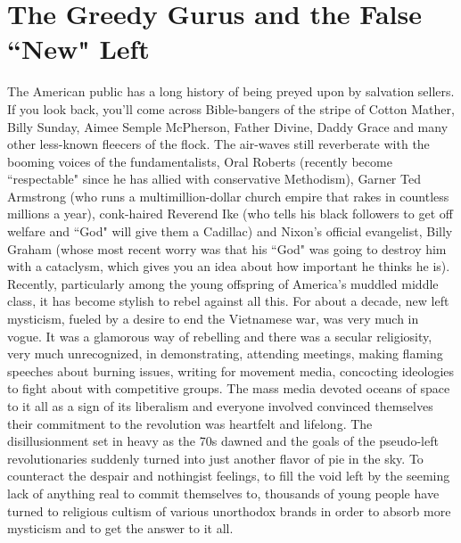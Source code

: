 \chapter{The Greedy Gurus and the False ``New" Left}

The American public has a long history of being preyed upon by salvation sellers. If you look back, you'll come across Bible-bangers of the stripe of Cotton Mather, Billy Sunday, Aimee Semple McPherson, Father Divine, Daddy Grace and many other less-known fleecers of the flock. The air-waves still reverberate with the booming voices of the fundamentalists, Oral Roberts (recently become ``respectable" since he has allied with conservative Methodism), Garner Ted Armstrong (who runs a multimillion-dollar church empire that rakes in countless millions a year), conk-haired Reverend Ike (who tells his black followers to get off welfare and ``God" will give them a Cadillac) and Nixon's official evangelist, Billy Graham (whose most recent worry was that his ``God" was going to destroy him with a cataclysm, which gives you an idea about how important he thinks he is).\\
Recently, particularly among the young offspring of America's muddled middle class, it has become stylish to rebel against all this. For about a decade, new left mysticism, fueled by a desire to end the Vietnamese war, was very much in vogue. It was a glamorous way of rebelling and there was a secular religiosity, very much unrecognized, in demonstrating, attending meetings, making flaming speeches about burning issues, writing for movement media, concocting ideologies to fight about with competitive groups. The mass media devoted oceans of space to it all as a sign of its liberalism and everyone involved convinced themselves their commitment to the revolution was heartfelt and lifelong. The disillusionment set in heavy as the 70s dawned and the goals of the pseudo-left revolutionaries suddenly turned into just another flavor of pie in the sky. To counteract the despair and nothingist feelings, to fill the void left by the seeming lack of anything real to commit themselves to, thousands of young people have turned to religious cultism of various unorthodox brands in order to absorb more mysticism and to get the answer to it all.\\
